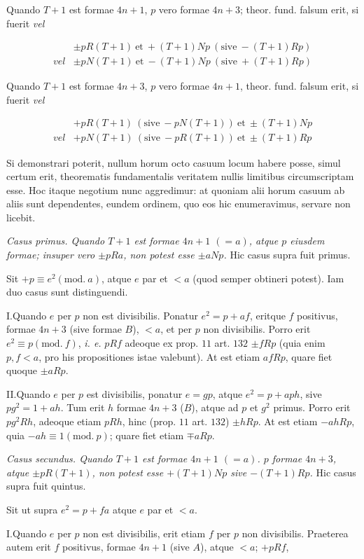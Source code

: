 Quando $T+1$ est formae $4n+1$, $p$ vero formae $4n+3$; theor. fund. falsum erit, si fuerit \emph{vel}

\[
\begin{array}{ll}&\pm pR(T+1)\ \text{et}\ +(T+1)Np\ (\text{sive}\ -(T+1)Rp)\\\textit{vel}&\pm pN(T+1)\ \text{et}\ -(T+1)Np\ (\text{sive}\ +(T+1)Rp)\end{array}
\]

Quando $T+1$ est formae $4n+3$, $p$ vero formae $4n+1$, theor. fund. falsum erit, si fuerit \emph{vel}

\[
\begin{array}{ll}&+pR(T+1)\ (\text{sive}\ -pN(T+1))\ \text{et}\ \pm(T+1)Np\\\textit{vel}&+pN(T+1)\ (\text{sive}\ -pR(T+1))\ \text{et}\ \pm(T+1)Rp\end{array}
\]

Si demonstrari poterit, nullum horum octo casuum locum habere posse, simul certum erit, theorematis fundamentalis veritatem nullis limitibus circumscriptam esse. Hoc itaque negotium nunc aggredimur: at quoniam alii horum casuum ab aliis sunt dependentes, eundem ordinem, quo eos hic enumeravimus, servare non licebit.


\emph{Casus primus. Quando $T+1$ est formae $4n+1$ $(=a)$, atque $p$ eiusdem formae; insuper vero $\pm pRa$, non potest esse $\pm aNp$.} Hic casus supra fuit primus.

Sit $+p\equiv e^2(\mathrm{mod.}\ a)$, atque $e$ par et $<a$ (quod semper obtineri potest). Iam duo casus sunt distinguendi.

I.\quad Quando $e$ per $p$ non est divisibilis. Ponatur $e^2=p+af$, eritque $f$ positivus, formae $4n+3$ (sive formae $B$), $<a$, et per $p$ non divisibilis. Porro erit $e^2\equiv p(\mathrm{mod.}\ f)$, \emph{i. e.} $pRf$ adeoque ex prop. $11$ art. $132$ $\pm fRp$ (quia enim $p,f<a$, pro his propositiones istae valebunt). At est etiam $afRp$, quare fiet quoque $\pm aRp$.

II.\quad Quando $e$ per $p$ est divisibilis, ponatur $e=gp$, atque $e^2=p+aph$, sive $pg^2=1+ah$. Tum erit $h$ formae $4n+3$ ($B$), atque ad $p$ et $g^2$ primus. Porro erit $pg^2Rh$, adeoque etiam $pRh$, hinc (prop. $11$ art. $132$) $\pm hRp$. At est etiam $-ahRp$, quia $-ah\equiv1(\mathrm{mod.}\ p)$; quare fiet etiam $\mp aRp$.


\emph{Casus secundus. Quando $T+1$ est formae $4n+1$ $(=a)$. $p$ formae $4n+3$, atque $\pm pR(T+1)$, non potest esse $+(T+1)Np$ sive $-(T+1)Rp$.} Hic casus supra fuit quintus.

Sit ut supra $e^2=p+fa$ atque $e$ par et $<a$.

I.\quad Quando $e$ per $p$ non est divisibilis, erit etiam $f$ per $p$ non divisibilis. Praeterea autem erit $f$ positivus, formae $4n+1$ (sive $A$), atque $<a$; $+pRf$,%
